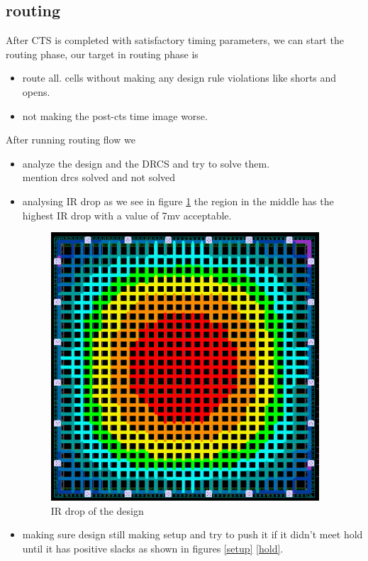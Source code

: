 \documentclass[../main.tex]{subfiles}
\begin{document}
 \subsection{routing}
After CTS is completed with satisfactory timing parameters, we can start the routing phase,
our target in routing phase is
\begin{itemize}
    \item route all. cells without making any design rule violations like shorts and opens.
    \item not making the post-cts time image worse.
\end{itemize}

\newpage 
After running routing flow we 
\begin{itemize}
    \item analyze the design and the DRCS and try to solve them.\\
    mention drcs solved and not solved 
    \item analysing IR drop as we see in figure \ref{fig:irdrop} the region in the middle has the highest IR drop with a value of 7mv acceptable. 
    \begin{figure}[h]
    \centering
    \includegraphics[width=10cm]{diagrams/irdrop.png}
    \caption{IR drop of the design}
    \label{fig:irdrop}
\end{figure}
    \item making sure design still making setup and try to push it if it didn't meet hold until it has positive slacks as shown in figures \ref{setup} \ref{hold}. 
    
\end{itemize}
\end{document}
